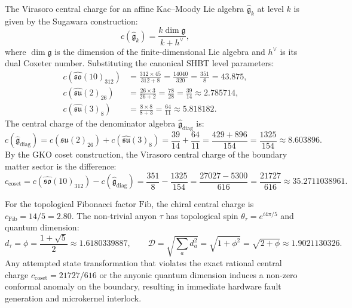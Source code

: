 \documentclass[11pt,onecolumn]{article}
\begin{document}
The Virasoro central charge for an affine Kac--Moody Lie algebra $\hat{\mathfrak{g}}_k$ at level $k$ is given by the Sugawara construction:
\begin{equation}
c(\hat{\mathfrak{g}}_k) = \frac{k \dim \mathfrak{g}}{k + h^\vee},
\label{eq:sugawara_central_charge}
\end{equation}
where $\dim \mathfrak{g}$ is the dimension of the finite-dimensional Lie algebra and $h^\vee$ is its dual Coxeter number. Substituting the canonical SHBT level parameters:
\begin{align}
c(\hat{\mathfrak{so}}(10)_{312}) &= \frac{312 \times 45}{312 + 8} = \frac{14040}{320} = \frac{351}{8} = 43.875, \label{eq:c_so10} \\
c(\hat{\mathfrak{su}}(2)_{26}) &= \frac{26 \times 3}{26 + 2} = \frac{78}{28} = \frac{39}{14} \approx 2.785714, \label{eq:c_su2} \\
c(\hat{\mathfrak{su}}(3)_8) &= \frac{8 \times 8}{8 + 3} = \frac{64}{11} \approx 5.818182. \label{eq:c_su3}
\end{align}
The central charge of the denominator algebra $\hat{\mathfrak{g}}_{\text{diag}}$ is:
\begin{equation}
c(\hat{\mathfrak{g}}_{\text{diag}}) = c(\hat{\mathfrak{su}}(2)_{26}) + c(\hat{\mathfrak{su}}(3)_8) = \frac{39}{14} + \frac{64}{11} = \frac{429 + 896}{154} = \frac{1325}{154} \approx 8.603896.
\end{equation}
By the GKO coset construction, the Virasoro central charge of the boundary matter sector is the difference:
\begin{equation}
c_{\text{coset}} = c(\hat{\mathfrak{so}}(10)_{312}) - c(\hat{\mathfrak{g}}_{\text{diag}}) = \frac{351}{8} - \frac{1325}{154} = \frac{27027 - 5300}{616} = \frac{21727}{616} \approx 35.2711038961.
\label{eq:c_coset}
\end{equation}

For the topological Fibonacci factor $\text{Fib}$, the chiral central charge is $c_{\text{Fib}} = 14/5 = 2.80$. The non-trivial anyon $\tau$ has topological spin $\theta_\tau = e^{i 4\pi/5}$ and quantum dimension:
\begin{equation}
d_\tau = \phi = \frac{1 + \sqrt{5}}{2} \approx 1.6180339887, \qquad \mathcal{D} = \sqrt{\sum_a d_a^2} = \sqrt{1 + \phi^2} = \sqrt{2 + \phi} \approx 1.9021130326.
\label{eq:fib_dimension}
\end{equation}
Any attempted state transformation that violates the exact rational central charge $c_{\text{coset}} = 21727/616$ or the anyonic quantum dimension induces a non-zero conformal anomaly on the boundary, resulting in immediate hardware fault generation and microkernel interlock.
\end{document}
